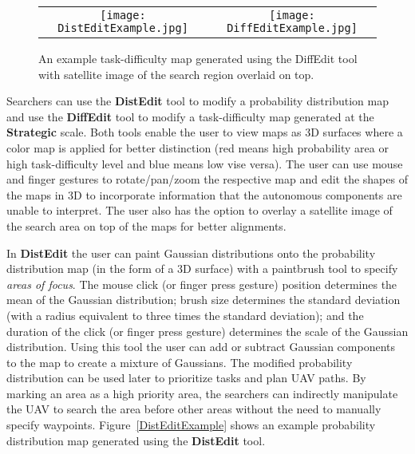 \begin{figure}
\centering
\begin{tabular}{cc}
	\begin{minipage}{0.45\textwidth}
	\centering
	\texttt{[image: DistEditExample.jpg]}
	\caption{An example probability distribution map generated using the DistEdit tool.}
	\label{DistEditExample}
	\end{minipage}
&
	\begin{minipage}{0.45\textwidth}
	\centering
	\texttt{[image: DiffEditExample.jpg]}
	\caption{An example task-difficulty map generated using the DiffEdit tool with satellite image of the search region overlaid on top.}
	\label{DiffEditExample}
	\end{minipage}
\end{tabular}
\end{figure}

Searchers can use the \textbf{DistEdit} tool to modify a probability distribution map and use the \textbf{DiffEdit} tool to modify a task-difficulty map generated at the \textbf{Strategic} scale. Both tools enable the user to view maps as 3D surfaces where a color map is applied for better distinction (red means high probability area or high task-difficulty level and blue means low vise versa). The user can use mouse and finger gestures to rotate/pan/zoom the respective map and edit the shapes of the maps in 3D to incorporate information that the autonomous components are unable to interpret. The user also has the option to overlay a satellite image of the search area on top of the maps for better alignments.

In \textbf{DistEdit} the user can paint Gaussian distributions onto the probability distribution map (in the form of a 3D surface) with a paintbrush tool to specify \textit{areas of focus}. The mouse click (or finger press gesture) position determines the mean of the Gaussian distribution; brush size determines the standard deviation (with a radius equivalent to three times the standard deviation); and the duration of the click (or finger press gesture) determines the scale of the Gaussian distribution. Using this tool the user can add or subtract Gaussian components to the map to create a mixture of Gaussians. The modified probability distribution can be used later to prioritize tasks and plan UAV paths. By marking an area as a high priority area, the searchers can indirectly manipulate the UAV to search the area before other areas without the need to manually specify waypoints. Figure~\ref{DistEditExample} shows an example probability distribution map generated using the \textbf{DistEdit} tool.

